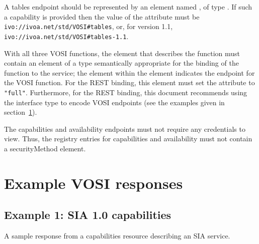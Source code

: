 \documentclass[11pt,letter]{ivoa}
\begin{document}
A tables endpoint should be represented by an element named , of type . If such a capability is provided then the value of the  attribute must be \nolinkurl{ivo://ivoa.net/std/VOSI\#tables}, or, for version 1.1, \nolinkurl{ivo://ivoa.net/std/VOSI\#tables-1.1}.

With all three VOSI functions, the  element that describes the function must contain an  element of a type semantically appropriate for the binding of the function to the service; the  element within the  element indicates the endpoint for the VOSI function. For the REST binding, this  element must set the  attribute to \texttt{"full"}. Furthermore, for the REST binding, this document recommends using the  interface type to encode VOSI endpoints (see the examples given in section~\ref{sec:examples}). 

The capabilities and availability endpoints must not require any credentials to view.  Thus, the  registry entries for capabilities and availability must not contain a securityMethod element.

\section{Example VOSI responses}
\label{sec:examples}

\subsection{Example 1: SIA 1.0 capabilities}

A sample response from a capabilities resource describing an SIA service. 
\end{document}
